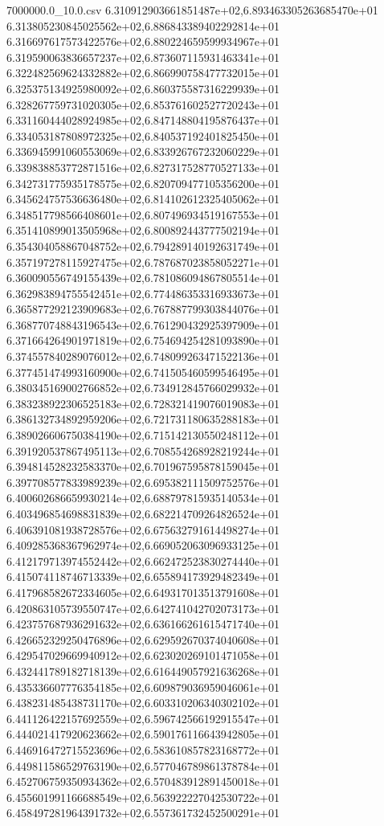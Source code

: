 \begin{filecontents*}{7000000.0_10.0.csv}
6.310912903661851487e+02,6.893463305263685470e+01
6.313805230845025562e+02,6.886843389402292814e+01
6.316697617573422576e+02,6.880224659599934967e+01
6.319590063836657237e+02,6.873607115931463341e+01
6.322482569624332882e+02,6.866990758477732015e+01
6.325375134925980092e+02,6.860375587316229939e+01
6.328267759731020305e+02,6.853761602527720243e+01
6.331160444028924985e+02,6.847148804195876437e+01
6.334053187808972325e+02,6.840537192401825450e+01
6.336945991060553069e+02,6.833926767232060229e+01
6.339838853772871516e+02,6.827317528770527133e+01
6.342731775935178575e+02,6.820709477105356200e+01
6.345624757536636480e+02,6.814102612325405062e+01
6.348517798566408601e+02,6.807496934519167553e+01
6.351410899013505968e+02,6.800892443777502194e+01
6.354304058867048752e+02,6.794289140192631749e+01
6.357197278115927475e+02,6.787687023858052271e+01
6.360090556749155439e+02,6.781086094867805514e+01
6.362983894755542451e+02,6.774486353316933673e+01
6.365877292123909683e+02,6.767887799303844076e+01
6.368770748843196543e+02,6.761290432925397909e+01
6.371664264901971819e+02,6.754694254281093890e+01
6.374557840289076012e+02,6.748099263471522136e+01
6.377451474993160900e+02,6.741505460599546495e+01
6.380345169002766852e+02,6.734912845766029932e+01
6.383238922306525183e+02,6.728321419076019083e+01
6.386132734892959206e+02,6.721731180635288183e+01
6.389026606750384190e+02,6.715142130550248112e+01
6.391920537867495113e+02,6.708554268928219244e+01
6.394814528232583370e+02,6.701967595878159045e+01
6.397708577833989239e+02,6.695382111509752576e+01
6.400602686659930214e+02,6.688797815935140534e+01
6.403496854698831839e+02,6.682214709264826524e+01
6.406391081938728576e+02,6.675632791614498274e+01
6.409285368367962974e+02,6.669052063096933125e+01
6.412179713974552442e+02,6.662472523830274440e+01
6.415074118746713339e+02,6.655894173929482349e+01
6.417968582672334605e+02,6.649317013513791608e+01
6.420863105739550747e+02,6.642741042702073173e+01
6.423757687936291632e+02,6.636166261615471740e+01
6.426652329250476896e+02,6.629592670374040608e+01
6.429547029669940912e+02,6.623020269101471058e+01
6.432441789182718139e+02,6.616449057921636268e+01
6.435336607776354185e+02,6.609879036959046061e+01
6.438231485438731170e+02,6.603310206340302102e+01
6.441126422157692559e+02,6.596742566192915547e+01
6.444021417920623662e+02,6.590176116643942805e+01
6.446916472715523696e+02,6.583610857823168772e+01
6.449811586529763190e+02,6.577046789861378784e+01
6.452706759350934362e+02,6.570483912891450018e+01
6.455601991166688549e+02,6.563922227042530722e+01
6.458497281964391732e+02,6.557361732452500291e+01

\end{filecontents*}
